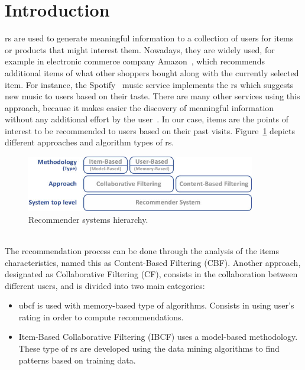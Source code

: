 \section{Introduction}
\label{sec:theRecommenderSystem} 
\gls{rs} are used to generate meaningful information to a collection of users for items or products that might interest them. Nowadays, they are widely used, for example in electronic commerce company Amazon~\cite{AmazonRecommendGLBSJY}, which recommends additional items of what other shoppers bought along with the currently selected item. For instance, the Spotify~\cite{spotifyRecommenderEngine} music service implements the \gls{rs} which suggests new music to users based on their taste. There are many other services using this approach, because it makes easier the discovery of meaningful information without any additional effort by the user~\cite{recommSystemPMVS}. In our case, items are the points of interest to be recommended to users based on their past visits. Figure~\ref{fig:recomenderAlgoirthms} depicts different approaches and algorithm types of \gls{rs}.\\
\begin{figure}[h!]
 \centering
   \includegraphics[width=10cm]{./images/flows/flow_recomender_hierarchy.jpg}
   \caption{Recommender systems hierarchy.}
   \label{fig:recomenderAlgoirthms}
\end{figure}
\\
The recommendation process can be done through the analysis of the items characteristics, named this as Content-Based Filtering (CBF). Another approach, designated as Collaborative Filtering (CF), consists in the collaboration between different users, and is divided into two main categories:
\begin{itemize}
\item \gls{ubcf} is used with memory-based type of algorithms. Consists in using user's rating in order to compute recommendations.
\item Item-Based Collaborative Filtering (IBCF) uses a model-based methodology. These type of \gls{rs} are developed using the data mining algorithms to find patterns based on training data.
\end{itemize}

